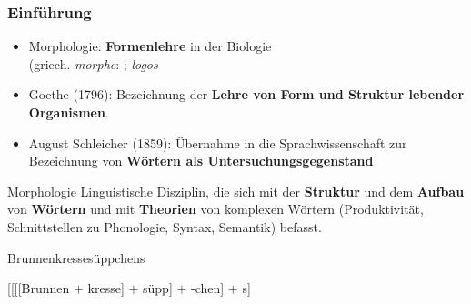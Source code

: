 \begin{frame}
\frametitle{Einführung}

\begin{itemize}
	\item Morphologie: \textbf{Formenlehre} in der Biologie \citep[vgl.][]{Salmon00a, Wurzel00a}\\
	(griech. \emph{morphe}: ; \emph{logos} 

	\item Goethe (1796): Bezeichnung der \textbf{Lehre von Form und Struktur lebender Organismen}.
	
	\item August Schleicher (1859): Übernahme in die Sprachwissenschaft zur Bezeichnung von \textbf{Wörtern als Untersuchungsgegenstand}

\end{itemize}

\pause 

\begin{block}{Morphologie}
	Linguistische Disziplin, die sich mit der \textbf{Struktur} und dem \textbf{Aufbau} von \textbf{Wörtern} und mit \textbf{Theorien} von komplexen Wörtern (Produktivität, Schnittstellen zu Phonologie, Syntax, Semantik) befasst.
\end{block}

\settowidth{} 
\ea Brunnenkressesüppchens 

\pause 

{[[[[Brunnen $+$ kresse] $+$ süpp] $+$ -chen] $+$ s]}
\z 

\end{frame}


